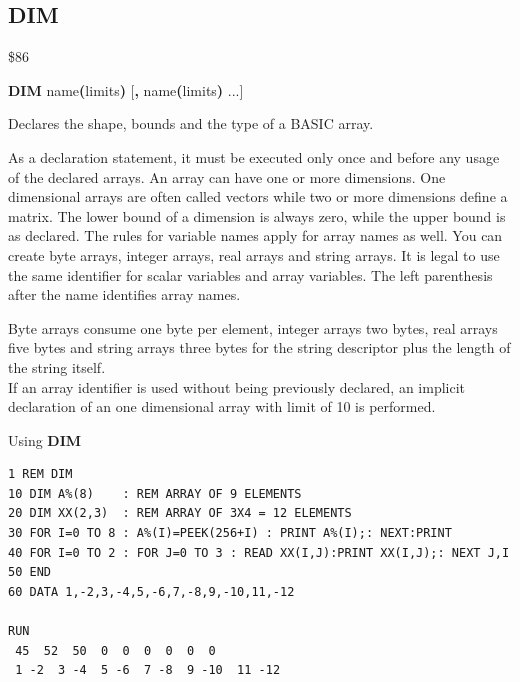 
\newpage
\subsection{DIM}
\begin{description}[leftmargin=2cm,style=nextline]
\item [Token:] \$86
\item [Format:] {\bf DIM} name{\bf(}limits{\bf)} [{\bf,} name{\bf(}limits{\bf)} ...]
\item [Usage:] Declares the shape,
               bounds and the type of a BASIC array.

               As a declaration statement, it must be executed
               only once and before any usage of the declared arrays.
               An array can have one or more dimensions.
               One dimensional arrays are often called vectors
               while two or more dimensions define a matrix.
               The lower bound of a dimension is always zero,
               while the upper bound is as declared. The rules for
               variable names apply for array names as well.
               You can create byte arrays, integer arrays, real arrays and string arrays.
               It is legal to use the same identifier for scalar
               variables and array variables. The left parenthesis
               after the name identifies array names.

\item [Remarks:] Byte arrays consume one byte per element, integer arrays two bytes,
                 real arrays five bytes and string arrays three bytes
                 for the string descriptor plus
                 the length of the string itself. \\
                 If an array identifier is used without being previously
                 declared, an implicit declaration of an
                 one dimensional array with limit of 10 is performed.

\item [Example:] Using {\bf DIM}
\begin{tcolorbox}[colback=black,coltext=white]
\verbatimfont{\codefont}
\begin{verbatim}
1 REM DIM
10 DIM A%(8)    : REM ARRAY OF 9 ELEMENTS
20 DIM XX(2,3)  : REM ARRAY OF 3X4 = 12 ELEMENTS
30 FOR I=0 TO 8 : A%(I)=PEEK(256+I) : PRINT A%(I);: NEXT:PRINT
40 FOR I=0 TO 2 : FOR J=0 TO 3 : READ XX(I,J):PRINT XX(I,J);: NEXT J,I
50 END
60 DATA 1,-2,3,-4,5,-6,7,-8,9,-10,11,-12

RUN
 45  52  50  0  0  0  0  0  0
 1 -2  3 -4  5 -6  7 -8  9 -10  11 -12
\end{verbatim}
\end{tcolorbox}
\end{description}

